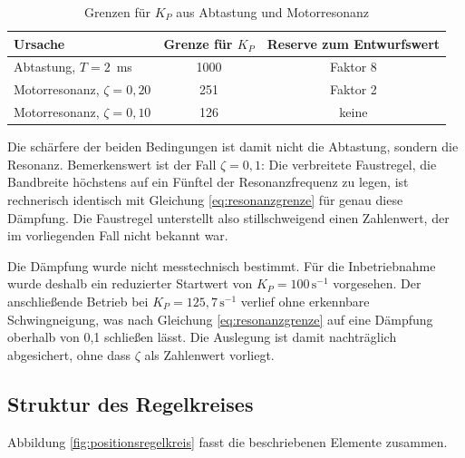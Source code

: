 \begin{table}[htbp]
    \centering
    \caption{Grenzen für $K_P$ aus Abtastung und Motorresonanz}
    \label{tab:stabilitaetsgrenzen}
    \begin{tabular}{lcc}
        \hline
        Ursache & Grenze für $K_P$ & Reserve zum Entwurfswert \\
        \hline
        Abtastung, $T = 2$~ms          & 1000 & Faktor 8 \\
        Motorresonanz, $\zeta = 0{,}20$ & 251  & Faktor 2 \\
        Motorresonanz, $\zeta = 0{,}10$ & 126  & keine \\
        \hline
    \end{tabular}
\end{table}

Die schärfere der beiden Bedingungen ist damit nicht die Abtastung, sondern die Resonanz.
Bemerkenswert ist der Fall $\zeta = 0{,}1$: Die verbreitete Faustregel, die Bandbreite
höchstens auf ein Fünftel der Resonanzfrequenz zu legen, ist rechnerisch identisch mit
Gleichung \ref{eq:resonanzgrenze} für genau diese Dämpfung. Die Faustregel unterstellt
also stillschweigend einen Zahlenwert, der im vorliegenden Fall nicht bekannt war.

Die Dämpfung wurde nicht messtechnisch bestimmt. Für die Inbetriebnahme wurde deshalb ein
reduzierter Startwert von $K_P = 100\,\mathrm{s^{-1}}$ vorgesehen. Der anschließende
Betrieb bei $K_P = 125{,}7\,\mathrm{s^{-1}}$ verlief ohne erkennbare Schwingneigung, was
nach Gleichung \ref{eq:resonanzgrenze} auf eine Dämpfung oberhalb von 0,1 schließen lässt.
Die Auslegung ist damit nachträglich abgesichert, ohne dass $\zeta$ als Zahlenwert
vorliegt.

\subsection*{Struktur des Regelkreises}

Abbildung \ref{fig:positionsregelkreis} fasst die beschriebenen Elemente zusammen.

